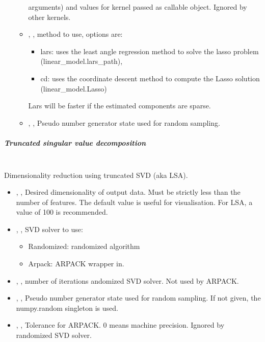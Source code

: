 \begin{itemize}
\begin{itemize}
		arguments) and values for kernel passed as callable object. Ignored by other
		kernels. 
		\item {}, , method to use,
		options are:
		\begin{itemize}
			\item lars: uses the least angle regression method to solve the lasso
			 problem (linear\_model.lars\_path),
			\item cd: uses the coordinate descent method to compute the Lasso solution
			 (linear\_model.Lasso)
		\end{itemize}
		Lars will be faster if the estimated components are sparse. 
		\item {}, ,
		 Pseudo number generator state used for random sampling. 
	\end{itemize}	
\end{itemize}

\subparagraph{Truncated singular value decomposition} \hfil \\
\label{subparagraph:TruncatedSVD}
Dimensionality reduction using truncated SVD (aka LSA).
\begin{itemize}
	\item {}, , Desired dimensionality
	of output data. Must be strictly less than the number of features. The default value is
	useful for visualisation. For LSA, a value of 100 is recommended. 
	\item {}, , SVD solver to use:
	\begin{itemize}
		\item Randomized: randomized algorithm
		\item Arpack: ARPACK wrapper in.
	\end{itemize}
	\item {}, , number of iterations andomized
	SVD solver. Not used by ARPACK. 
	\item {}, , Pseudo number
	generator state used for random sampling. If not given, the numpy.random singleton is used.
	\item {}, , Tolerance for ARPACK. 0 means machine
	precision. Ignored by randomized SVD solver. 
\end{itemize}

